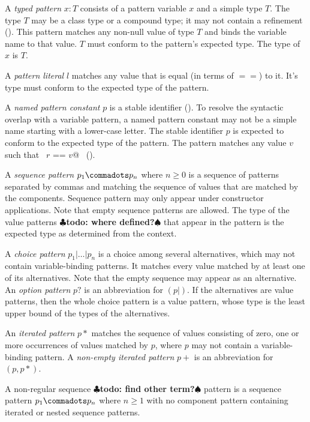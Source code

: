 \documentclass[a4paper,12pt,twoside,titlepage]{book}
\renewcommand{\todo}[1]{{$\clubsuit$\bf todo: #1$\spadesuit$}}
\begin{document}
A {\em typed pattern} $x: T$ consists of a pattern variable $x$ and a
simple type $T$. The type $T$ may be a class type or a compound type;
it may not contain a refinement ().  This
pattern matches any non-null value of type $T$ and binds the variable
name to that value.  $T$ must conform to the pattern's expected
type. The type of $x$ is $T$.

A {\em pattern literal} $l$ matches any value that is equal (in terms
of $==$) to it. It's type must conform to the expected type of the
pattern.

A {\em named pattern constant} $p$ is a stable identifier
(). To resolve the syntactic overlap with a
variable pattern, a named pattern constant may not be a simple name
starting with a lower-case letter. The stable identifier $p$ is
expected to conform to the expected type of the pattern. The pattern
matches any value $v$ such that ~\lstinline@$r$ == $v$@~ 
().

A {\em sequence pattern} $p_1 \commadots p_n$ where $n \geq 0$ is a
sequence of patterns separated by commas and matching the sequence of
values that are matched by the components. Sequence pattern may only
appear under constructor applications. Note that empty sequence
patterns are allowed. The type of the value patterns \todo{where defined?}
that appear in
the pattern is the expected type as determined from the context.

A {\em choice pattern} $p_1 | \ldots | p_n$ is a choice among several
alternatives, which may not contain variable-binding patterns. It
matches every value matched by at least one of its alternatives. Note
that the empty sequence may appear as an alternative.  An {\em option
pattern} $p?$ is an abbreviation for $(p| )$. If the alternatives
are value patterns, then the whole choice pattern is a value pattern,
whose type is the least upper bound of the types of the alternatives.

An {\em iterated pattern} $p*$ matches the sequence of values
consisting of zero, one or more occurrences of values matched by $p$,
where $p$ may not contain a variable-binding pattern. A {\em non-empty
iterated pattern} $p+$ is an abbreviation for $(p,p*)$. 

A non-regular sequence \todo{find other term?}
pattern is a sequence pattern $p_1 \commadots p_n$ 
where $n \geq 1$ with no component pattern containing iterated or nested
sequence patterns.
\end{document}
